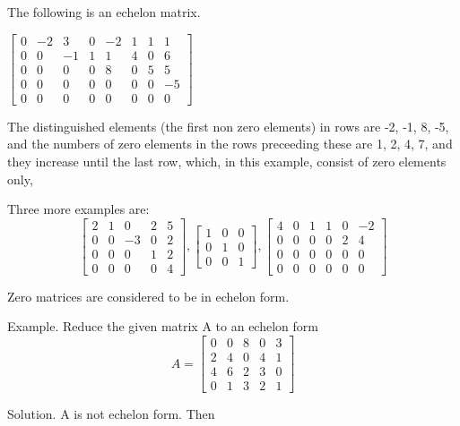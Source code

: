 \documentclass[11pt]{amsbook}
\begin{document}

The following is an echelon matrix.
\\

\begin{center}
$\begin{bmatrix}
0 & -2 & 3 &0  & -2 & 1 & 1& 1\\ 
0 &0  & -1 & 1&  1&  4&  0& 6\\ 
0 & 0 &  0&  0&  8 &  0&  5& 5\\ 
0 & 0 &  0&  0&  0& 0 &  0& -5\\ 
0 & 0 &  0&  0&  0&  0&  0&  0
\end{bmatrix}$
\end{center}


The distinguished elements (the first non zero elements) in rows are -2, -1, 8, -5, and the numbers of zero elements in the rows preceeding these are 1, 2, 4, 7, and they increase until the last row, which, in this example, consist of zero elements only,

Three more examples are:
\\
\begin{equation*}
  \begin{bmatrix}
2 &  1& 0 &  2& 5\\ 
0 &  0& -3 & 0 & 2\\ 
0 &  0&  0&  1& 2\\ 
0 &  0&  0&  0& 4 
  \end{bmatrix}
  ,
\begin{bmatrix}
1 &0  & 0\\ 
0 & 1 & 0\\ 
0 & 0 & 1
\end{bmatrix}
,
\begin{bmatrix}
4 & 0 & 1 & 1 & 0 & -2\\ 
0 & 0 & 0 & 0 & 2 & 4\\ 
0 & 0 & 0 & 0 & 0 & 0\\ 
0 & 0 & 0 & 0 & 0 & 0
\end{bmatrix}
\end{equation*}

Zero matrices are considered to be in echelon form. 

Example. Reduce the given matrix A to an echelon form 
\\
\begin{equation*}
A =
  \begin{bmatrix}

0 & 0 & 8 & 0 & 3\\ 
2 & 4 & 0 & 4 & 1\\ 
4 & 6 & 2 & 3 & 0\\ 
0 & 1 & 3 & 2 & 1

  \end{bmatrix}
\end{equation*}

Solution. A is not echelon form. Then
\end{document}
